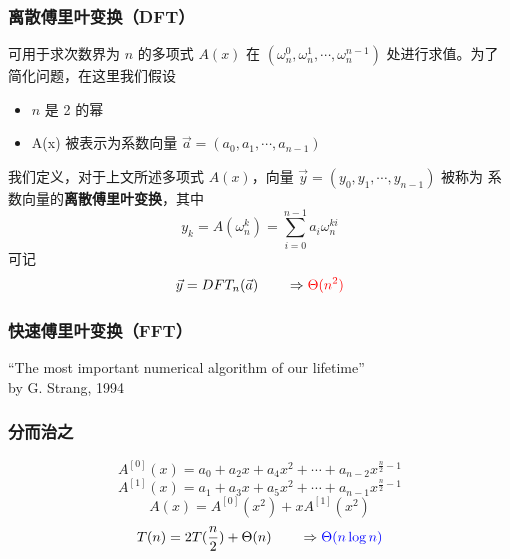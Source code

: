 \documentclass[UTF8]{ctexbeamer}
\begin{document}
\begin{frame}
    \frametitle{离散傅里叶变换（DFT）}
    可用于求次数界为 $n$ 的多项式 $A(x)$ 在
    $(\omega_n^{0}, \omega_n^{1}, \cdots, \omega_n^{n - 1})$
    处进行求值。为了简化问题，在这里我们假设
    \begin{itemize}
        \item $n$ 是 2 的幂
        \item A(x) 被表示为系数向量 $\vec{a} = (a_0, a_1, \cdots, a_{n-1})$
    \end{itemize}
    我们定义，对于上文所述多项式 $A(x)$，向量 $\vec{y} = (y_0, y_1, \cdots, y_{n-1})$ 被称为
    系数向量的\textbf{离散傅里叶变换}，其中
    $$y_k = A(\omega_n^k) = \sum_{i = 0}^{n-1} a_i \omega_n^{ki}$$
    可记
    $$\vec{y} = DFT_n(\vec{a}) \qquad \Rightarrow \textcolor{red}{\Theta(n^2)}$$
\end{frame}

\begin{frame}
    \frametitle{快速傅里叶变换（FFT）}
    \centering ``The most important numerical algorithm of our lifetime'' \\ by G. Strang, 1994
\end{frame}

\begin{frame}
    \frametitle{分而治之}
    $$A^{[0]}(x) = a_0 + a_2 x + a_4 x^2 + \cdots + a_{n-2} x^{\frac{n}{2} - 1}$$
    $$A^{[1]}(x) = a_1 + a_3 x + a_5 x^2 + \cdots + a_{n-1} x^{\frac{n}{2} - 1}$$
    $$A(x) = A^{[0]}(x^2) + xA^{[1]}(x^2)$$
    $$T(n) = 2T(\frac{n}{2}) + \Theta(n) \qquad \Rightarrow \textcolor{blue}{\Theta(n \log n)}$$
\end{frame}
\end{document}
